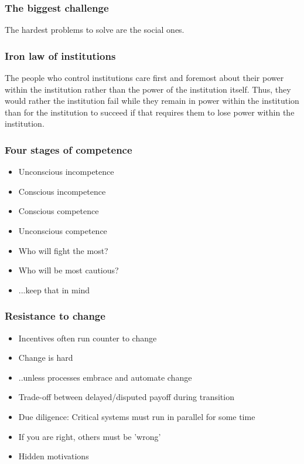 \documentclass[t]{beamer}
\begin{document}
\begin{frame}
	\frametitle{The biggest challenge}
		\begin{center}
			\vfill
			The hardest problems to solve are the social ones.
			\vfill
		\end{center}
\end{frame}

\begin{frame}
	\frametitle{Iron law of institutions}
	\vfill
	The people who control institutions care first and foremost about their power within the institution rather than the power of the institution itself. Thus, they would rather the institution fail while they remain in power within the institution than for the institution to succeed if that requires them to lose power within the institution.
	\vfill
\end{frame}

\begin{frame}
	\frametitle{Four stages of competence}
	\begin{itemize}
		\item Unconscious incompetence
		\item Conscious incompetence
		\item Conscious competence
		\item Unconscious competence
			\vfill 
		\item Who will fight the most?
		\item Who will be most cautious?
		\item ...keep that in mind
	\end{itemize}
\end{frame}

\begin{frame}
	\frametitle{Resistance to change}
	\begin{itemize}
		\item Incentives often run counter to change
		\item Change is hard
		\item ..unless processes embrace and automate change
		\item Trade-off between delayed/disputed payoff during transition
		\item Due diligence: Critical systems must run in parallel for some time
		\item If you are right, others must be 'wrong'
		\item Hidden motivations
	\end{itemize}
\end{frame}
\end{document}
